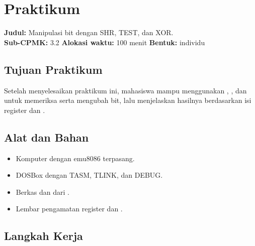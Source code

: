 \section{Praktikum}
\label{sec:praktikum-bab11}

\begin{praktikumbox}
\vspace{1.1em}
\textbf{Judul:} Manipulasi bit dengan SHR, TEST, dan XOR.\\[0.3em]
\textbf{Sub-CPMK:} 3.2 \quad\textbullet\quad
\textbf{Alokasi waktu:} 100 menit \quad\textbullet\quad
\textbf{Bentuk:} individu
\end{praktikumbox}

\subsection{Tujuan Praktikum}

Setelah menyelesaikan praktikum ini, mahasiswa mampu menggunakan
, , dan  untuk memeriksa serta mengubah
bit, lalu menjelaskan hasilnya berdasarkan isi register dan
.

\subsection{Alat dan Bahan}

\begin{itemize}
    \item Komputer dengan emu8086 terpasang.
    \item DOSBox dengan TASM, TLINK, dan DEBUG.
    \item Berkas  dan  dari
          .
    \item Lembar pengamatan register dan .
\end{itemize}

\subsection{Langkah Kerja}

